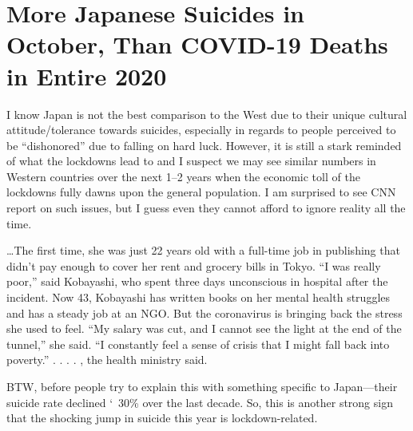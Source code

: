 \chapter{More Japanese Suicides in October, Than COVID-19 Deaths in Entire 2020}

\begin{refsection}

I know Japan is not the best comparison to the West due to their unique cultural attitude/tolerance towards suicides, especially in regards to people perceived to be \enquote{dishonored} due to falling on hard luck. However, it is still a stark reminded of what the lockdowns lead to and I suspect we may see similar numbers in Western countries over the next 1--2 years when the economic toll of the lockdowns fully dawns upon the general population. I am surprised to see CNN report on such issues, but I guess even they cannot afford to ignore reality all the time.

\begin{tcolorbox}[quote]

\dots{}The first time, she was just 22 years old with a full-time job in publishing that didn't pay enough to cover her rent and grocery bills in Tokyo.\textsuperscript{\cite{urlbb1a13f7}} \enquote{I was really poor,} said Kobayashi, who spent three days unconscious in hospital after the incident. Now 43, Kobayashi has written books on her mental health struggles and has a steady job at an NGO. But the coronavirus is bringing back the stress she used to feel. \enquote{My salary was cut, and I cannot see the light at the end of the tunnel,} she said. \enquote{I constantly feel a sense of crisis that I might fall back into poverty.} . . . . , the health ministry said.\textsuperscript{\cite{url1ffa32f6}}

\end{tcolorbox}

BTW, before people try to explain this with something specific to Japan---their suicide rate declined \char`~30\% over the last decade. So, this is another strong sign that the shocking jump in suicide this year is lockdown-related.\textsuperscript{\cite{urlea1081cd}}


\printbibliography[heading=subbibliography]

\end{refsection}